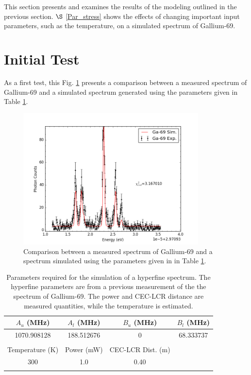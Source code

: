 \noindent This section presents and examines the results of the modeling outlined in the previous section. $\S$ \ref{Par_stress} shows the effects of changing important input parameters, such as the temperature, on a simulated spectrum of Gallium-69.  

\section{Initial Test}
As a first test, this Fig. \ref{comp} presents a comparison between a measured spectrum of Gallium-69 and a simulated spectrum generated using the parameters given in Table \ref{othercoeff}.

\begin{figure}[h]
\centering
\includegraphics[width = 0.85\textwidth]{Graphics/Ga-69-vs-sim.png}
\caption[Comparison between a measured spectrum of Gallium-69 and a spectrum simulated.]{\small Comparison between a measured spectrum of Gallium-69 and a spectrum simulated using the parameters given in in Table \ref{othercoeff}.}
\label{comp}
\end{figure}

\begin{table}[h]
\centering
\begin{tabular}{c c c c}\hline
$A_u$ (MHz)&$A_l$ (MHz)&$B_u$ (MHz)&$B_l$ (MHz)\\ \hline
1070.908128 & 188.512676 & 0 & 68.333737 \\ \hline \\ \hline
Temperature (K)&Power (mW)&CEC-LCR Dist. (m)&\\ \hline
300 & 1.0 & 0.40\\ \hline \\
\end{tabular}
\caption[Parameters required for the simulation of a hyperfine spectrum.]{\small Parameters required for the simulation of a hyperfine spectrum. The hyperfine parameters are from a previous measurement of the the spectrum of Gallium-69.\citep{gapap} The power and CEC-LCR distance are measured quantities, while the temperature is estimated.}
\label{othercoeff}
\end{table}

